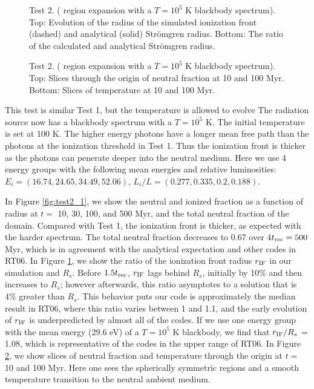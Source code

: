 \documentclass[12pt,preprint]{aastex}
\begin{document}
\begin{figure}[t]
  \caption{\label{fig:test2_2} Test 2. ( region expansion
    with a $T=10^5$ K blackbody spectrum).  Top: Evolution of the
    radius of the simulated ionization front (dashed) and analytical
    (solid) Str\"{o}mgren radius.  Bottom: The ratio of the calculated
    and analytical Str\"{o}mgren radius.}
\end{figure}

\begin{figure}[]
  \caption{\label{fig:test2_3} Test 2. ( region expansion
    with a $T=10^5$ K blackbody spectrum).  Top: Slices through the
    origin of neutral fraction at 10 and 100 Myr.  Bottom: Slices of
    temperature at 10 and 100 Myr.}
\end{figure}

This test is similar Test 1, but the temperature is allowed to evolve
The radiation source now has a blackbody spectrum with a $T = 10^5$ K.
The initial temperature is set at 100 K.  The higher energy photons
have a longer mean free path than the photons at the ionization
threshold in Test 1.  Thus the ionization front is thicker as the
photons can penerate deeper into the neutral medium.  Here we use 4
energy groups with the following mean energies and relative
luminosities: $E_i = (16.74, 24.65, 34.49, 52.06)$, $L_i/L = (0.277,
0.335, 0.2, 0.188)$.

In Figure \ref{fig:test2_1}, we show the neutral and ionized fraction
as a function of radius at $t = $ 10, 30, 100, and 500 Myr, and the
total neutral fraction of the domain.  Compared with Test 1, the
ionization front is thicker, as expected with the harder spectrum.
The total neutral fraction decreases to 0.67 over 4$t_{\rm rec} = 500$
Myr, which is in agreement with the analytical expectation and other
codes in RT06.  In Figure \ref{fig:test2_2}, we show the ratio of the
ionization front radius $r_{\rm IF}$ in our simulation and $R_s$.
Before $1.5t_{\rm rec}$, $r_{\rm IF}$ lags behind $R_s$, initially by
10\% and then increases to $R_s$; however afterwards, this ratio
asymptotes to a solution that is 4\% greater than $R_s$.  This
behavior puts our code is approximately the median result in RT06,
where this ratio varies between 1 and 1.1, and the early evolution of
$r_{\rm IF}$ is underpredicted by almost all of the codes.  If we use
one energy group with the mean energy (29.6 eV) of a $T=10^5$ K
blackbody, we find that $r_{\rm IF}/R_s$ = 1.08, which is
representative of the codes in the upper range of RT06.  In Figure
\ref{fig:test2_3}, we show slices of neutral fraction and temperature
through the origin at $t = $ 10 and 100 Myr.  Here one sees the
spherically symmetric  regions and a smooth temperature
transition to the neutral ambient medium.
\end{document}
